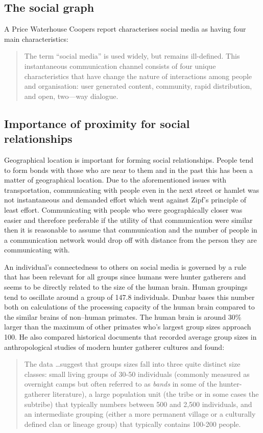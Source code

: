 \subsection{The social graph}
A Price Waterhouse Coopers report characterises social media as having four main characteristics:
\begin{quotation}
The term ``social media'' is used widely, but remains ill-defined. This instantaneous communication channel consists of four unique characteristics that have change the nature of interactions among people and organisation: user generated content, community, rapid distribution, and open, two---way dialogue\cite{RefWorks:131}. 
\end{quotation}
\subsection{Importance of proximity for social relationships}
Geographical location is important for forming social relationships. People tend to form bonds with those who are near to them and in the past this has been a matter of geographical location. Due to the aforementioned issues with transportation, communicating with people even in the next street or hamlet was not instantaneous and demanded effort which went against Zipf's principle of least effort. Communicating with people who were geographically closer was easier and therefore preferable if the utility of that communication were similar then it is reasonable to assume that communication and the number of people in a communication network would drop off with distance from the person they are communicating with.

An individual's connectedness to others on social media is governed by a rule that has been relevant for all groups since humans were hunter gatherers and seems to be directly related to the size of the human brain\cite{RefWorks:439}. Human groupings tend to oscillate around a group of 147.8 individuals. Dunbar bases this number both on calculations of the processing capacity of the human brain compared to the similar brains of non--human primates. The human brain is around 30\% larger than the maximum of other primates who's largest group sizes approach 100. He also compared historical documents that recorded average group sizes in anthropological studies of modern hunter gatherer cultures and found:

\begin{quotation}
The data \ldots suggest that groups sizes fall into three quite distinct size classes: small living groups of 30-50 individuals (commonly measured as overnight camps but often referred to as \emph{bands} in some of the hunter-gatherer literature), a large population unit (the tribe or in some cases the subtribe) that typically numbers between 500 and 2,500 individuals, and an intermediate grouping (either a more permanent village or a culturally defined clan or lineage group) that typically contains 100-200 people\cite[p684-5]{RefWorks:439}.
\end{quotation}


